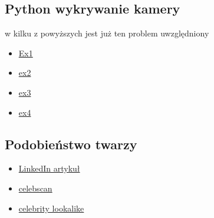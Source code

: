 \documentclass[a4paper]{mwart}
\begin{document}
\subsection{Python wykrywanie kamery}
w kilku z powyższych jest już ten problem uwzględniony
\begin{itemize}
	\item \href{http://www.chioka.in/python-live-video-streaming-example/}{Ex1}
	\item \href{https://github.com/yushuhuang/webcam}{ex2}
	\item \href{https://benhowell.github.io/guide/2015/03/09/opencv-and-web-cam-streaming}{ex3}
	\item \href{https://stackoverflow.com/questions/14140495/how-to-capture-a-video-and-audio-in-python-from-a-camera-or-webcam}{ex4}
\end{itemize}

\subsection{Podobieństwo twarzy}
\begin{itemize}
	\item \href{https://www.linkedin.com/pulse/using-deep-learning-fashion-similarity-face-vaibhav-gusain/}{LinkedIn artykuł}
	\item \href{http://fizzylogic.nl/2017/08/04/which-celebrity-are-you-a-celebrity-scanner-built-with-clarifai/}{celebscan}
	\item \href{https://blog.biolab.si/2016/11/25/celebrity-lookalike-or-how-to-make-students-love-machine-learning/}{celebrity lookalike}
\end{itemize}
\end{document}
